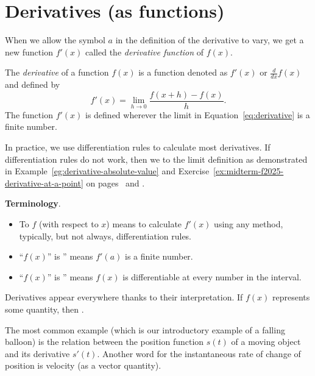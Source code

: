 \documentclass[../main.tex]{subfiles}
\begin{document}
 \section{Derivatives (as functions)}

When we allow the symbol \(a\) in the definition of the derivative to vary, we get a new function \(f'(x)\) called the \emph{derivative function} of \(f(x)\).

\begin{definition}
  The \emph{derivative} of a function \(f(x)\) is a function denoted as \(f'(x)\) or \(\frac{d}{dx} f(x)\) and defined by
  \begin{equation} \label{eq:derivative}
    f'(x) = {\lim_{h \to 0} \frac{f(x+h) - f(x)}{h}}.
  \end{equation}
  The function \(f'(x)\) is defined wherever the limit in Equation~\eqref{eq:derivative} is a finite number.

\end{definition}

In practice, we use differentiation rules to calculate most derivatives. If differentiation rules do not work, then we  to the limit definition as demonstrated in Example~\ref{eg:derivative-absolute-value} and Exercise~\ref{ex:midterm-f2025-derivative-at-a-point} on pages~\pageref{eg:derivative-absolute-value} and \pageref{ex:midterm-f2025-derivative-at-a-point}.

\textbf{Terminology}.
\begin{itemize}
  \item To  \(f\) (with respect to \(x\)) means to calculate \(f'(x)\) using any method, typically, but not always, differentiation rules.
  \item \enquote{\(f(x)\)} is '' means \(f'(a)\) is a finite number.
  \item \enquote{\(f(x)\)} is '' means \(f(x)\) is differentiable at every number in the interval.
\end{itemize}
\bigskip

\faStar{} Derivatives appear everywhere thanks to their interpretation.  If \(f(x)\) represents some quantity, then .

The most common example (which is our introductory example of a falling balloon) is the relation between the position function \(s(t)\) of a moving object and its derivative \(s'(t)\).  Another word for the instantaneous rate of change of position is velocity (as a vector quantity).
\end{document}
